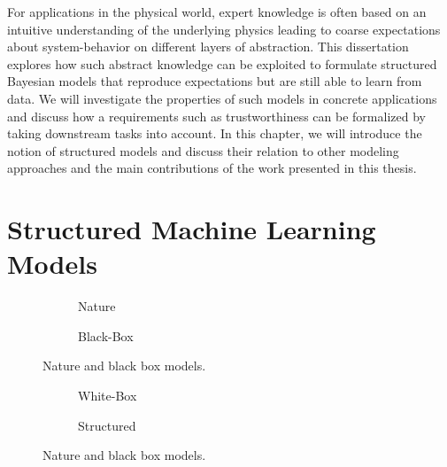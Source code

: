 For applications in the physical world, expert knowledge is often based on an intuitive understanding of the underlying physics leading to coarse expectations about system-behavior on different layers of abstraction.
This dissertation explores how such abstract knowledge can be exploited to formulate structured Bayesian models that reproduce expectations but are still able to learn from data.
We will investigate the properties of such models in concrete applications and discuss how a requirements such as trustworthiness can be formalized by taking downstream tasks into account.
In this chapter, we will introduce the notion of structured models and discuss their relation to other modeling approaches and the main contributions of the work presented in this thesis.


\section{Structured Machine Learning Models}
\begin{figure}[t]
    \begin{subfigure}[b]{\halffigurewidth}
        \centering
        \caption{
            \label{fig:introduction:models:nature}
            Nature
        }
    \end{subfigure}
    \hfill
    \begin{subfigure}[b]{\halffigurewidth}
        \centering
        \caption{
            \label{fig:introduction:models:black_box}
            Black-Box
        }
    \end{subfigure}
    \caption{
        \label{fig:introduction:models:one}
        Nature and black box models.
    }
\end{figure}
\begin{figure}[t]
    \begin{subfigure}[b]{\halffigurewidth}
        \centering
        \caption{
            \label{fig:introduction:models:white_box}
            White-Box
        }
    \end{subfigure}
    \hfill
    \begin{subfigure}[b]{\halffigurewidth}
        \centering
        \caption{
            \label{fig:introduction:models:structured}
            Structured
        }
    \end{subfigure}
    \caption{
        \label{fig:introduction:models:two}
        Nature and black box models.
    }
\end{figure}
